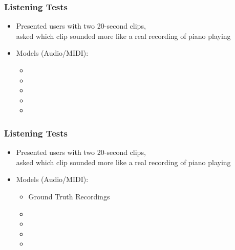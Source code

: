 \documentclass[dvipdfmx]{beamer}
\begin{document}
\begin{frame}
    \frametitle{Listening Tests}
    \begin{itemize}
        \item Presented users with two 20-second clips, \\
            asked which clip sounded more like a real recording of piano playing
    \end{itemize}
    \begin{itemize}
        \item Models {\scriptsize (Audio/MIDI)}:
        \begin{itemize}
            \item {}
            \item {}
            \item {}
            \item {}
            \item {}
        \end{itemize}
    \end{itemize}
\end{frame}


\begin{frame}[noframenumbering]
    \frametitle{Listening Tests}
    \begin{itemize}
        \item Presented users with two 20-second clips, \\
            asked which clip sounded more like a real recording of piano playing
    \end{itemize}
    \begin{itemize}
        \item Models {\scriptsize (Audio/MIDI)}:
        \begin{itemize}
            \item \alert{Ground Truth Recordings}
            \item {}
            \item {}
            \item {}
            \item {}
        \end{itemize}
    \end{itemize}
\end{frame}
\end{document}
